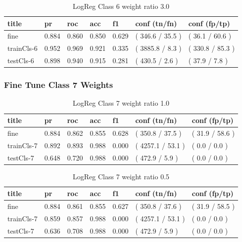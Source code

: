 \documentclass[ms]{nuthesis}
\begin{document}
\FloatBarrier
\begin{table}[H]
\centering
\begin{tabular}{|l||l||l||l||l||l||l|}\toprule
title & pr & roc & acc & f1 & conf (tn/fn) & conf (fp/tp) \\ \midrule
fine & 0.884 & 0.860 & 0.850 & 0.629 & ( 346.6 / 35.5 ) & ( 36.1 / 60.6 ) \\
trainCls-6 & 0.952 & 0.969 & 0.921 & 0.335 & ( 3885.8 / 8.3 ) & ( 330.8 / 85.3 ) \\
testCls-6 & 0.898 & 0.940 & 0.915 & 0.281 & ( 430.5 / 2.6 ) & ( 37.9 / 7.8 ) \\ \bottomrule
\end{tabular}
\caption{LogReg Class 6 weight ratio 3.0}
\label{tab:LogRegCls6-Wt3}
\end{table}
\FloatBarrier


\subsubsection{Fine Tune Class 7 Weights}
\FloatBarrier
\begin{table}[H]
\centering
\begin{tabular}{|l||l||l||l||l||l||l|}\toprule
title & pr & roc & acc & f1 & conf (tn/fn) & conf (fp/tp) \\ \midrule
fine & 0.884 & 0.862 & 0.855 & 0.628 & ( 350.8 / 37.5 ) & ( 31.9 / 58.6 ) \\
trainCls-7 & 0.892 & 0.893 & 0.988 & 0.000 & ( 4257.1 / 53.1 ) & ( 0.0 / 0.0 ) \\
testCls-7 & 0.648 & 0.720 & 0.988 & 0.000 & ( 472.9 / 5.9 ) & ( 0.0 / 0.0 ) \\ \bottomrule
\end{tabular}
\caption{LogReg Class 7 weight ratio 1.0}
\label{tab:LogRegCls7-Wt1}
\end{table}
\FloatBarrier

\FloatBarrier
\begin{table}[H]
\centering
\begin{tabular}{|l||l||l||l||l||l||l|}\toprule
title & pr & roc & acc & f1 & conf (tn/fn) & conf (fp/tp) \\ \midrule
fine & 0.884 & 0.861 & 0.855 & 0.627 & ( 350.8 / 37.6 ) & ( 31.9 / 58.5 ) \\
trainCls-7 & 0.859 & 0.857 & 0.988 & 0.000 & ( 4257.1 / 53.1 ) & ( 0.0 / 0.0 ) \\
testCls-7 & 0.636 & 0.708 & 0.988 & 0.000 & ( 472.9 / 5.9 ) & ( 0.0 / 0.0 ) \\ \bottomrule
\end{tabular}
\caption{LogReg Class 7 weight ratio 0.5}
\label{tab:LogRegCls7-Wtp5}
\end{table}
\FloatBarrier
\end{document}
